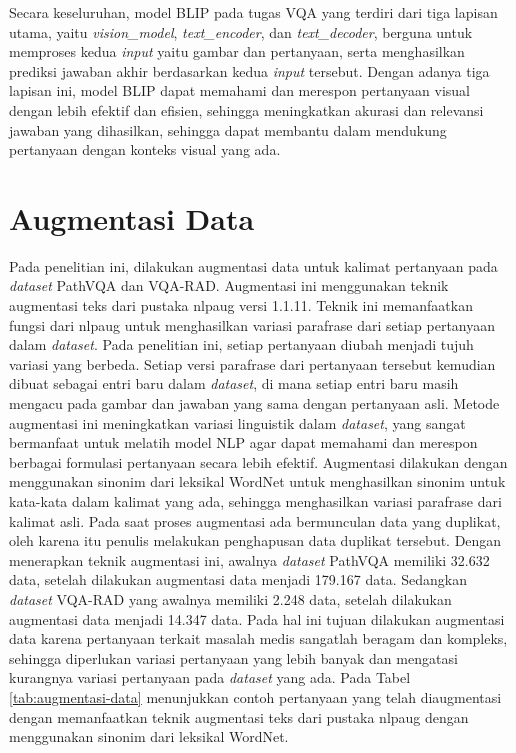 Secara keseluruhan, model BLIP pada tugas VQA yang terdiri dari tiga lapisan utama, yaitu \textit{vision\_model}, \textit{text\_encoder}, dan \textit{text\_decoder}, berguna untuk memproses kedua \textit{input} yaitu gambar dan pertanyaan, serta menghasilkan prediksi jawaban akhir berdasarkan kedua \textit{input} tersebut. Dengan adanya tiga lapisan ini, model BLIP dapat memahami dan merespon pertanyaan visual dengan lebih efektif dan efisien, sehingga meningkatkan akurasi dan relevansi jawaban yang dihasilkan, sehingga dapat membantu dalam mendukung pertanyaan dengan konteks visual yang ada.

\section{Augmentasi Data}

\par Pada penelitian ini, dilakukan augmentasi data untuk kalimat pertanyaan pada \textit{dataset} PathVQA dan VQA-RAD. Augmentasi ini menggunakan teknik augmentasi teks dari pustaka nlpaug versi 1.1.11. Teknik ini memanfaatkan fungsi dari nlpaug untuk menghasilkan variasi parafrase dari setiap pertanyaan dalam \textit{dataset}. Pada penelitian ini, setiap pertanyaan diubah menjadi tujuh variasi yang berbeda. Setiap versi parafrase dari pertanyaan tersebut kemudian dibuat sebagai entri baru dalam \textit{dataset}, di mana setiap entri baru masih mengacu pada gambar dan jawaban yang sama dengan pertanyaan asli. Metode augmentasi ini meningkatkan variasi linguistik dalam \textit{dataset}, yang sangat bermanfaat untuk melatih model NLP agar dapat memahami dan merespon berbagai formulasi pertanyaan secara lebih efektif. Augmentasi dilakukan dengan menggunakan sinonim dari leksikal WordNet untuk menghasilkan sinonim untuk kata-kata dalam kalimat yang ada, sehingga menghasilkan variasi parafrase dari kalimat asli. Pada saat proses augmentasi ada bermunculan data yang duplikat, oleh karena itu penulis melakukan penghapusan data duplikat tersebut. Dengan menerapkan teknik augmentasi ini, awalnya \textit{dataset} PathVQA memiliki 32.632 data, setelah dilakukan augmentasi data menjadi 179.167 data. Sedangkan \textit{dataset} VQA-RAD yang awalnya memiliki 2.248 data, setelah dilakukan augmentasi data menjadi 14.347 data. Pada hal ini tujuan dilakukan augmentasi data karena pertanyaan terkait masalah medis sangatlah beragam dan kompleks, sehingga diperlukan variasi pertanyaan yang lebih banyak dan mengatasi kurangnya variasi pertanyaan pada \textit{dataset} yang ada. Pada Tabel \ref{tab:augmentasi-data} menunjukkan contoh pertanyaan yang telah diaugmentasi dengan memanfaatkan teknik augmentasi teks dari pustaka nlpaug dengan menggunakan sinonim dari leksikal WordNet.


